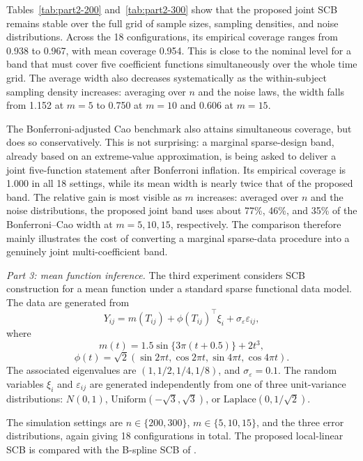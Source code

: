\documentclass[12pt]{article} %
\theoremstyle{definition}
\begin{document}
Tables~\ref{tab:part2-200} and~\ref{tab:part2-300} show that the proposed
joint SCB remains stable over the full grid of sample sizes, sampling
densities, and noise distributions. Across the 18 configurations, its empirical
coverage ranges from 0.938 to 0.967, with mean coverage 0.954. This is close to
the nominal level for a band that must cover five coefficient functions
simultaneously over the whole time grid. The average width also decreases
systematically as the within-subject sampling density increases: averaging over
\(n\) and the noise laws, the width falls from 1.152 at \(m=5\) to 0.750 at
\(m=10\) and 0.606 at \(m=15\).

The Bonferroni-adjusted Cao benchmark also attains simultaneous coverage, but
does so conservatively. This is not surprising: a marginal sparse-design band,
already based on an extreme-value approximation, is being asked to deliver a
joint five-function statement after Bonferroni inflation. Its empirical
coverage is 1.000 in all 18 settings, while its mean width is nearly twice that
of the proposed band. The relative gain is most visible as \(m\) increases:
averaged over \(n\) and the noise distributions, the proposed joint band uses
about 77\%, 46\%, and 35\% of the Bonferroni--Cao width at \(m=5,10,15\),
respectively. The comparison therefore mainly illustrates the cost of
converting a marginal sparse-data procedure into a genuinely joint
multi-coefficient band.

\emph{Part 3: mean function inference.}
The third experiment considers SCB construction for a mean function under a
standard sparse functional data model. The data are generated from
\begin{equation}
\label{eq:part3-dgp}
Y_{ij}=m(T_{ij})+\phi(T_{ij})^\top\xi_i+
\sigma_\varepsilon\varepsilon_{ij},
\end{equation}
where
\[
m(t)=1.5\sin\{3\pi(t+0.5)\}+2t^3,
\]
\[
\phi(t)=\sqrt2(\sin2\pi t,\cos2\pi t,\sin4\pi t,\cos4\pi t).
\]
The associated eigenvalues are \((1,1/2,1/4,1/8)\), and
\(\sigma_\varepsilon=0.1\). The random variables \(\xi_i\) and
\(\varepsilon_{ij}\) are generated independently from one of three
unit-variance distributions: \(N(0,1)\),
\(\mathrm{Uniform}(-\sqrt3,\sqrt3)\), or
\(\mathrm{Laplace}(0,1/\sqrt2)\).

The simulation settings are \(n\in\{200,300\}\),
\(m\in\{5,10,15\}\), and the three error distributions, again giving 18
configurations in total. The proposed local-linear SCB is compared with the
B-spline SCB of \citet{CaiHu2025}.
\end{document}
